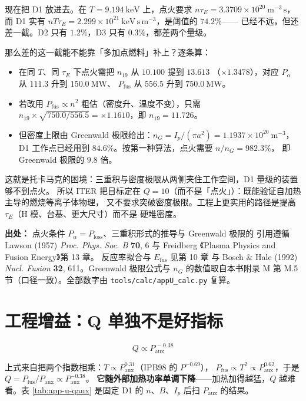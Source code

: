 现在把 D1 放进去。在 $T=9.194\ \mathrm{keV}$ 上，点火要求
$n\tau_E = 3.3709\times10^{20}\ \mathrm{m^{-3}\,s}$，而 D1 实有
$nT\tau_E = 2.299\times10^{21}\ \mathrm{keV\,s\,m^{-3}}$，是阈值的 $74.2\%$——
已经不远，但还差一截。D2 只有 $1.2\%$，D3 只有 $0.3\%$，都差两个量级。

那么差的这一截能不能靠「多加点燃料」补上？逐条算：
\begin{itemize}
  \item 在同 $T$、同 $\tau_E$ 下点火需把 $n_{19}$ 从 $10.100$ 提到 $13.613$
        （$\times1.3478$），对应 $P_\alpha$ 从 $111.3$ 升到 $150.0\ \mathrm{MW}$、
        $P_{\mathrm{fus}}$ 从 $556.5$ 升到 $750.0\ \mathrm{MW}$。
  \item 若改用 $P_{\mathrm{fus}}\propto n^2$ 粗估（密度升、温度不变），只需
        $n_{19}\times\sqrt{750.0/556.5} = \times1.1610$，即 $n_{19}=11.726$。
  \item 但密度上限由 Greenwald 极限给出：$n_G = I_p/(\pi a^2) = 1.1937\times10^{20}\ \mathrm{m^{-3}}$，
        D1 工作点已经用到 $84.6\%$。按第一种算法，点火需要 $n/n_G = 982.3\%$，
        即 Greenwald 极限的 $9.8$ 倍。
\end{itemize}

这就是托卡马克的困境：三重积与密度极限从两侧夹住工作空间，D1 量级的装置够不到点火。
所以 ITER 把目标定在 $Q=10$（而不是「点火」）：既能验证自加热主导的燃烧等离子体物理，
又不要求突破密度极限。工程上更实用的路径是提高 $\tau_E$（H 模、台基、更大尺寸）而不是
硬堆密度。

{\footnotesize
\textbf{出处：} 点火条件 $P_\alpha=P_{\mathrm{loss}}$、三重积形式的推导与 Greenwald 极限的
引用遵循 Lawson (1957) \textit{Proc. Phys. Soc. B} \textbf{70}, 6 与 Freidberg
《Plasma Physics and Fusion Energy》第 13 章。
反应率拟合与 $E_{\mathrm{fus}}$ 见第 10 章
与 Bosch \& Hale (1992) \textit{Nucl. Fusion} \textbf{32}, 611。Greenwald 极限公式与
$n_G$ 的数值取自本书附录 M 第 M.5 节（口径一致）。全部数字由 \texttt{tools/\allowbreak{}calc/\allowbreak{}appU\_calc.py}
复算。
}

\section{工程增益：Q 单独不是好指标}
\label{sec:app-u-qeng}

\begin{equation}
Q \propto P_{\mathrm{aux}}^{\,-0.38}
\label{eq:app-u-qaux}
\end{equation}

上式来自把两个指数相乘：$T\propto P_{\mathrm{aux}}^{0.31}$（IPB98 的 $P^{-0.69}$），
$P_{\mathrm{fus}}\propto T^2\propto P_{\mathrm{aux}}^{0.62}$，于是
$Q = P_{\mathrm{fus}}/P_{\mathrm{aux}} \propto P_{\mathrm{aux}}^{-0.38}$。
\textbf{它随外部加热功率单调下降}——加热加得越猛，$Q$ 越难看。表 \ref{tab:app-u-qaux}
是固定 D1 的 $n$、$B$、$I_p$ 后扫 $P_{\mathrm{aux}}$ 的结果。

